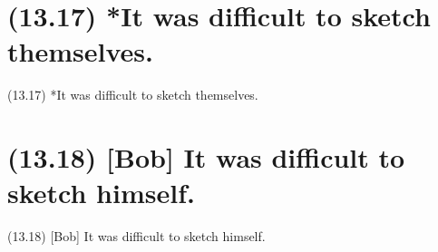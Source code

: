 \documentclass{article}
\begin{document}
\clearpage

%
%

\section*{(13.17) *It was difficult to sketch themselves.}

\bigbreak
\begin{enumerate*}
\item[(13.17)] *It was difficult to sketch themselves.
\end{enumerate*}
\bigbreak

\bigbreak
\begin{minipage}{\textwidth}
\end{minipage}
\bigbreak

\clearpage

%
%

\section*{(13.18) [Bob] It was difficult to sketch himself.}

\bigbreak
\begin{enumerate*}
\item[(13.18)] [Bob] It was difficult to sketch himself.
\end{enumerate*}
\bigbreak

\bigbreak
\begin{minipage}{\textwidth}
\end{minipage}
\bigbreak
\end{document}
